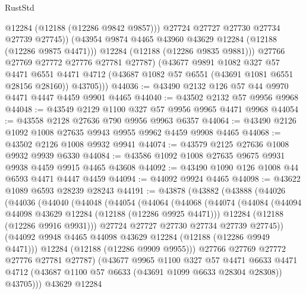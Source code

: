\begin{lexlean}{RustStd}
\begin{coremodule}
                  @12284
                  (@12188 (@12286 @9842 @9857)))
                @27724
                @27727
                @27730
                @27734
                @27739
                @27745))
            (@43954 @9874 @4465 @43960 @43629 @12284 (@12188 (@12286 @9875 @4471)))
            @12284
            (@12188 (@12286 @9835 @9881)))
          @27766
          @27769
          @27772
          @27776
          @27781
          @27787)
        (@43677
          @9891
          @1082
          @327
          @57
          @4471
          @6551
          @4471
          @4712
          (@43687 @1082 @57 @6551 (@43691 @1081 @6551 @28156 @28160))
          @43705)))
@44036 := @43490 @2132 @126 @57 @44 @9970 @4471 @4447 @4459 @9901 @4465
@44040 := @43502 @2132 @57 @9956 @9968
@44048 := @43549 @2129 @1100 @327 @57 @9956 @9965 @4471 @9968
@44054 := @43558 @2128 @27636 @790 @9956 @9963 @6357
@44064 := @43490 @2126 @1092 @1008 @27635 @9943 @9955 @9962 @4459 @9908 @4465
@44068 := @43502 @2126 @1008 @9932 @9941
@44074 := @43579 @2125 @27636 @1008 @9932 @9939 @6330
@44084 := @43586 @1092 @1008 @27635 @9675 @9931 @9938 @4459 @9915 @4465 @43608
@44092 := @43490 @1090 @126 @1008 @44 @6593 @4471 @4447 @4459
@44094 := @44092 @9924 @4465
@44098 := @43622 @1089 @6593 @28239 @28243
@44191 := @43878
    (@43882
      (@43888
        (@44026
          (@44036
            (@44040
              (@44048
                (@44054
                  (@44064
                    (@44068
                      (@44074
                        (@44084
                          (@44094 @44098 @43629 @12284 (@12188 (@12286 @9925 @4471)))
                          @12284
                          (@12188 (@12286 @9916 @9931)))
                        @27724
                        @27727
                        @27730
                        @27734
                        @27739
                        @27745))
                    (@44092 @9948 @4465 @44098 @43629 @12284 (@12188 (@12286 @9949 @4471)))
                    @12284
                    (@12188 (@12286 @9909 @9955)))
                  @27766
                  @27769
                  @27772
                  @27776
                  @27781
                  @27787)
                (@43677
                  @9965
                  @1100
                  @327
                  @57
                  @4471
                  @6633
                  @4471
                  @4712
                  (@43687 @1100 @57 @6633 (@43691 @1099 @6633 @28304 @28308))
                  @43705)))
            @43629
            @12284

\end{coremodule}
\end{lexlean}
